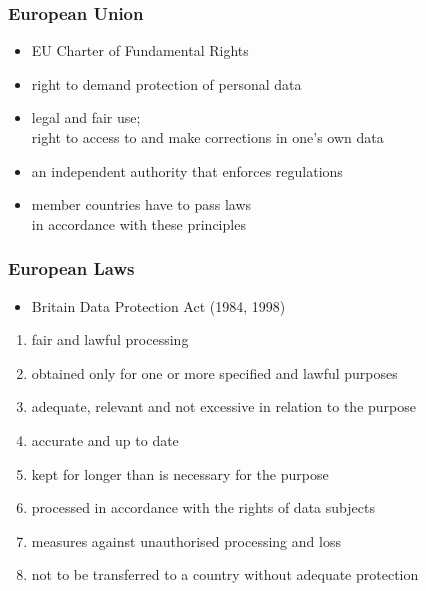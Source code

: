\documentclass[dvipsnames]{beamer}
\theoremstyle{plain}
\begin{document}
\begin{frame}
  \frametitle{European Union}

  \begin{itemize}
    \item EU Charter of Fundamental Rights

    \smallskip
    \item right to demand protection of personal data
    \item legal and fair use;\\
      right to access to and make corrections in one's own data
    \item an independent authority that enforces regulations

    \bigskip
    \item member countries have to pass laws\\
      in accordance with these principles
  \end{itemize}
\end{frame}

\begin{frame}
  \frametitle{European Laws}

  \begin{itemize}
   \item Britain Data Protection Act (1984, 1998)
  \end{itemize}

  \begin{enumerate}
    \item fair and lawful processing
    \item obtained only for one or more specified and lawful purposes
    \item adequate, relevant and not excessive in relation to the purpose
    \item accurate and up to date
    \item kept for longer than is necessary for the purpose
    \item processed in accordance with the rights of data subjects
    \item measures against unauthorised processing and loss
    \item not to be transferred to a country without adequate protection
  \end{enumerate}
\end{frame}
\end{document}
